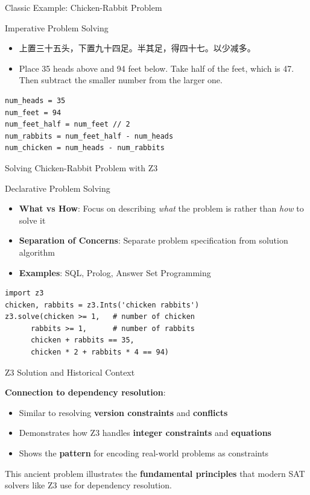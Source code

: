\documentclass{beamer}
\begin{document}
\begin{frame}[t,fragile]{Classic Example: Chicken-Rabbit Problem}

\begin{block}{Imperative Problem Solving}
    \scriptsize
\begin{itemize}
    \item 上置三十五头，下置九十四足。半其足，得四十七。以少减多。
    \item Place 35 heads above and 94 feet below.  Take half of the feet, which is 47.  Then subtract the smaller number from the larger one.
\end{itemize}

\end{block}

\scriptsize
\begin{verbatim}
num_heads = 35
num_feet = 94
num_feet_half = num_feet // 2
num_rabbits = num_feet_half - num_heads
num_chicken = num_heads - num_rabbits
\end{verbatim}

\end{frame}

\begin{frame}[fragile,t]{Solving Chicken-Rabbit Problem with Z3}
    \begin{block}{Declarative Problem Solving}
        \scriptsize
        \begin{itemize}
            \item \textbf{What vs How}: Focus on describing \textit{what} the problem is rather than \textit{how} to solve it
            \item \textbf{Separation of Concerns}: Separate problem specification from solution algorithm
            \item \textbf{Examples}: SQL, Prolog, Answer Set Programming
        \end{itemize}
    \end{block}
\scriptsize
    \begin{verbatim}
import z3
chicken, rabbits = z3.Ints('chicken rabbits')
z3.solve(chicken >= 1,   # number of chicken
      rabbits >= 1,      # number of rabbits
      chicken + rabbits == 35,
      chicken * 2 + rabbits * 4 == 94)
\end{verbatim}
\end{frame}

\begin{frame}[t]{Z3 Solution and Historical Context}

\textbf{Connection to dependency resolution}:
\begin{itemize}
\item Similar to resolving \textbf{version constraints} and \textbf{conflicts}
\item Demonstrates how Z3 handles \textbf{integer constraints} and \textbf{equations}
\item Shows the \textbf{pattern} for encoding real-world problems as constraints
\end{itemize}

This ancient problem illustrates the \textbf{fundamental principles} that modern SAT solvers like Z3 use for dependency resolution.
\end{frame}
\end{document}
